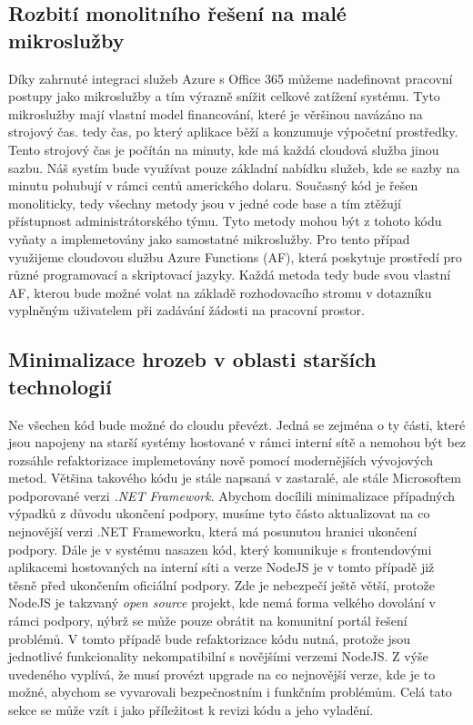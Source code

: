 \documentclass[12pt]{article}
\begin{document}
\begin{sloppypar}
\begin{spacing}{1.15}
        \subsection*{Rozbití monolitního řešení na malé mikroslužby}
        Díky zahrnuté integraci služeb Azure s Office 365 můžeme nadefinovat 
        pracovní postupy jako mikroslužby a tím výrazně snížit celkové zatížení
        systému. Tyto mikroslužby mají vlastní model financování, které je
        věršinou navázáno na strojový čas. tedy čas, po který aplikace běží a
        konzumuje výpočetní prostředky. Tento strojový čas je počítán na minuty,
        kde má každá cloudová služba jinou sazbu. Náš systím bude využívat pouze
        základní nabídku služeb, kde se sazby na minutu pohubují v rámci centů
        amerického dolaru. Současný kód je řešen monoliticky, tedy všechny
        metody jsou v jedné code base a tím ztěžují přístupnost
        administrátorského týmu. Tyto metody mohou být z tohoto kódu vyňaty a
        implemetovány jako samostatné mikroslužby. Pro tento případ využijeme
        cloudovou službu Azure Functions (AF), která poskytuje prostředí pro různé
        programovací a skriptovací jazyky. Každá metoda tedy bude svou vlastní
        AF, kterou bude možné volat na základě rozhodovacího stromu v dotazníku
        vyplněným uživatelem při zadávání žádosti na pracovní prostor. 
        
        \subsection*{Minimalizace hrozeb v oblasti starších technologií}
        Ne všechen kód bude možné do cloudu převézt. Jedná se zejména o ty
        části, které jsou napojeny na starší systémy hostované v rámci interní
        sítě a nemohou být bez rozsáhle refaktorizace implemetovány nově pomocí
        modernějších vývojových metod. Většina takového kódu je stále napsaná v
        zastaralé, ale stále Microsoftem podporované verzi \textit{.NET Framework}.
        Abychom docílili minimalizace případných výpadků z důvodu ukončení
        podpory, musíme tyto částo aktualizovat na co nejnovější verzi .NET
        Frameworku, která má posunutou hranici ukončení podpory. Dále je v
        systému nasazen kód, který komunikuje s frontendovými aplikacemi
        hostovaných na interní síti a verze NodeJS je v tomto případě již těsně
        před ukončením oficiální podpory. Zde je nebezpečí ještě větší, protože
        NodeJS je takzvaný \textit{open source} projekt, kde nemá forma velkého
        dovolání v rámci podpory, nýbrž se může pouze obrátit na komunitní
        portál řešení problémů. V tomto případě bude refaktorizace kódu nutná,
        protože jsou jednotlivé funkcionality nekompatibilní s novějšími verzemi
        NodeJS. Z výše uvedeného vyplívá, že musí provézt upgrade na co nejnovější 
        verze, kde je to možné, abychom se vyvarovali bezpečnostním i funkčním
        problémům. Celá tato sekce se může vzít i jako příležitost k revizi kódu
        a jeho vyladění.


\end{spacing}
\end{sloppypar}
\end{document}
